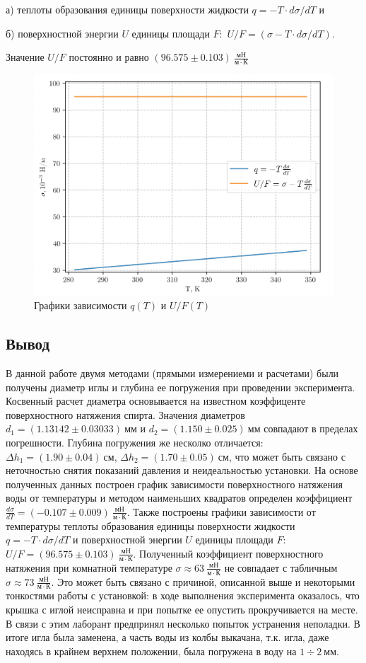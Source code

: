 \documentclass[12pt,a4paper]{article}
\begin{document}
\begin{enumerate}
    а) теплоты образования единицы поверхности жидкости $q = -T\cdot d\sigma/dT$ и 
    
    б) поверхностной энергии $U$ единицы площади $F$:\ $U/F = (\sigma - T \cdot d \sigma/dT)$. 
    
    Значение $U/F$ постоянно и равно $(96.575 \pm 0.103)\ \frac {мН}{м\cdot К}$

    
    \begin{figure}[ht]
        \centering
        \includegraphics[width=0.6\linewidth]{q_UF_t.png}
        \caption{Графики зависимости $q(T)$ и $U/F (T)$}
    \end{figure}
\end{enumerate}

\subsection*{Вывод}
В данной работе двумя методами (прямыми измерениеми и расчетами) были получены диаметр иглы и глубина ее погружения при проведении эксперимента. Косвенный расчет диаметра основывается на известном коэффиценте поверхностного натяжения спирта.
Значения диаметров $d_1 =(1.13142\pm 0.03033)\ мм$ и $d_2 = (1.150 \pm 0.025)\ мм$ совпадают в пределах погрешности. Глубина погружения же несколко отличается: $\Delta h_1 = (1.90 \pm 0.04)\ см$, $\Delta h_2 = (1.70\pm 0.05)\ см$, что может быть связано с неточностью снятия показаний давления и неидеальностью установки. 
На основе полученных данных построен график зависимости поверхностного натяжения воды от температуры и методом наименьших квадратов определен коэффициент $\frac {d\sigma}{dT} = (-0.107\pm 0.009)\ \frac {мН}{м\cdot К}$. 
Также построены графики зависимости от температуры теплоты образования единицы поверхности жидкости $q = -T\cdot d\sigma/dT$ и поверхностной энергии $U$ единицы площади $F$:\ $U/F = (96.575 \pm 0.103)\ \frac {мН}{м\cdot К}$. 
Полученный коэффициент поверхностного натяжения при комнатной температуре $\sigma \approx 63 \ \frac {мН}{м\cdot К} $ не совпадает с табличным $\sigma \approx 73\ \frac {мН}{м\cdot К}$. 
Это может быть связано с причиной, описанной выше и некоторыми тонкостями работы с установкой: в ходе выполнения эксперимента оказалось, что крышка с иглой неисправна и при попытке ее опустить прокручивается на месте.
В связи с этим лаборант предпринял несколько попыток устранения неполадки.
В итоге игла была заменена, а часть воды из колбы выкачана, т.к. игла, даже находясь в крайнем верхнем положении, была погружена в воду на $1\div2\ мм$.
\end{document}

